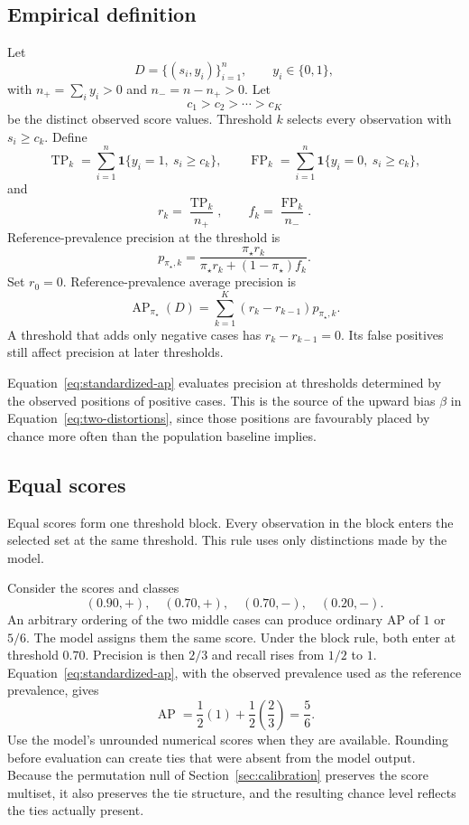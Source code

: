 \documentclass[11pt]{article}
\newcommand{\AP}{\operatorname{AP}}
\theoremstyle{remark}
\begin{document}
\subsection{Empirical definition}

Let
\[
D=\{(s_i,y_i)\}_{i=1}^{n},
\qquad y_i\in\{0,1\},
\]
with $n_+=\sum_i y_i>0$ and $n_-=n-n_+>0$. Let
\[
c_1>c_2>\cdots>c_K
\]
be the distinct observed score values. Threshold $k$ selects every observation with $s_i\geq c_k$. Define
\[
\operatorname{TP}_k
=
\sum_{i=1}^{n}\mathbf{1}\{y_i=1,\ s_i\geq c_k\},
\qquad
\operatorname{FP}_k
=
\sum_{i=1}^{n}\mathbf{1}\{y_i=0,\ s_i\geq c_k\},
\]
and
\[
r_k=\frac{\operatorname{TP}_k}{n_+},
\qquad
f_k=\frac{\operatorname{FP}_k}{n_-}.
\]
Reference-prevalence precision at the threshold is
\begin{equation}
p_{\pi_\star,k}
=
\frac{\pi_\star r_k}
{\pi_\star r_k+(1-\pi_\star)f_k}.
\label{eq:empirical-reference-precision}
\end{equation}
Set $r_0=0$. Reference-prevalence average precision is
\begin{equation}
\AP_{\pi_\star}(D)
=
\sum_{k=1}^{K}
(r_k-r_{k-1})p_{\pi_\star,k}.
\label{eq:standardized-ap}
\end{equation}
A threshold that adds only negative cases has $r_k-r_{k-1}=0$. Its false positives still affect precision at later thresholds.

Equation~\eqref{eq:standardized-ap} evaluates precision at thresholds determined by the observed positions of positive cases. This is the source of the upward bias $\beta$ in Equation~\eqref{eq:two-distortions}, since those positions are favourably placed by chance more often than the population baseline implies.

\subsection{Equal scores}

Equal scores form one threshold block. Every observation in the block enters the selected set at the same threshold. This rule uses only distinctions made by the model.

Consider the scores and classes
\[
(0.90,+),\quad(0.70,+),\quad(0.70,-),\quad(0.20,-).
\]
An arbitrary ordering of the two middle cases can produce ordinary AP of $1$ or $5/6$. The model assigns them the same score. Under the block rule, both enter at threshold $0.70$. Precision is then $2/3$ and recall rises from $1/2$ to $1$. Equation~\eqref{eq:standardized-ap}, with the observed prevalence used as the reference prevalence, gives
\[
\AP
=
\frac12(1)+\frac12\left(\frac23\right)
=
\frac56.
\]
Use the model's unrounded numerical scores when they are available. Rounding before evaluation can create ties that were absent from the model output. Because the permutation null of Section~\ref{sec:calibration} preserves the score multiset, it also preserves the tie structure, and the resulting chance level reflects the ties actually present.
\end{document}
